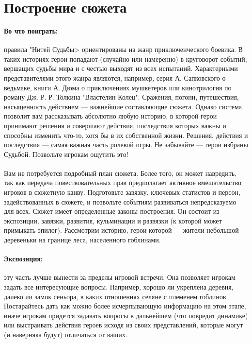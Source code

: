 \section{Построение сюжета}
\paragraph{Во что поиграть:} правила "Нитей Судьбы> ориентированы на жанр приключенческого боевика. В таких историях герои попадают (случайно или намеренно) в круговорот событий, вершащих судьбы мира и с честью выходят из всех испытаний. Характерными представителями этого жанра являются, например, серия А. Сапковского о ведьмаке, книги А. Дюма о приключениях мушкетеров или кинотрилогия по роману Дж. Р. Р. Толкина "Властелин Колец". Сражения, погони, путешествия, насыщенность действием — важнейшие составляющие сюжета. Однако система позволит вам рассказывать абсолютно любую историю, в которой герои принимают решения и совершают действия, последствия которых важны и способны изменить что-то, хотя бы в их собственной жизни. Решения, действия и последствия — самая важная часть ролевой игры. Не забывайте — герои избраны Судьбой. Позвольте игрокам ощутить это!
\paragraph{}
Вам не потребуется подробный план сюжета. Более того, он может навредить, так как передача повествовательных прав предполагает активное вмешательство игроков в сюжетную канву. Подготовьте завязку, ключевых статистов и персон, задействованных в сюжете, и позвольте событиям развиваться непредсказуемо для всех. Сюжет имеет определенные законы построения. Он состоит из экспозиции, завязки, развития, кульминации и развязки (к которой может примыкать эпилог). Рассмотрим историю, герои которой — жители небольшой деревеньки на границе леса, населенного гоблинами.
\paragraph{Экспозиция:} эту часть лучше вынести за пределы игровой встречи. Она позволяет игрокам задать все интересующие вопросы. Например, хорошо ли укреплена деревня, далеко ли замок сеньора, в каких отношениях селяне с племенем гоблинов. Постарайтесь дать как можно более исчерпывающую информацию на этом этапе, иначе игрокам придется задавать вопросы в дальнейшем (что повредит динамике) или выстраивать действия героев исходя из своих представлений, которые могут (и наверняка будут) отличаться от ваших.
